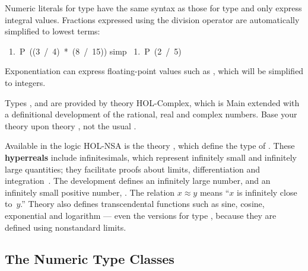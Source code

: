 Numeric literals
for type  have the same syntax as those for type
 and only express integral values.  Fractions expressed
using the division operator are automatically simplified to lowest terms:
\begin{isabelle}
\ 1.\ P\ ((3\ /\ 4)\ *\ (8\ /\ 15))\isanewline
{} simp\isanewline
\ 1.\ P\ (2\ /\ 5)
\end{isabelle}
Exponentiation can express floating-point values such as
, which will be simplified to integers.

\begin{warn}
Types ,  and  are provided by theory HOL-Complex, which is
Main extended with a definitional development of the rational, real and complex
numbers.  Base your theory upon theory , not the
usual .%
\end{warn}

Available in the logic HOL-NSA is the
theory , which define the type  of
.  These
\textbf{hyperreals} include infinitesimals, which represent infinitely
small and infinitely large quantities; they facilitate proofs
about limits, differentiation and integration~\cite{fleuriot-jcm}.  The
development defines an infinitely large number,  and an
infinitely small positive number, .  The
relation $x\approx y$ means ``$x$ is infinitely close to~$y$.''
Theory  also defines transcendental functions such as sine,
cosine, exponential and logarithm --- even the versions for type
, because they are defined using nonstandard limits.%
%
%


\subsection{The Numeric Type Classes}\label{sec:numeric-classes}

